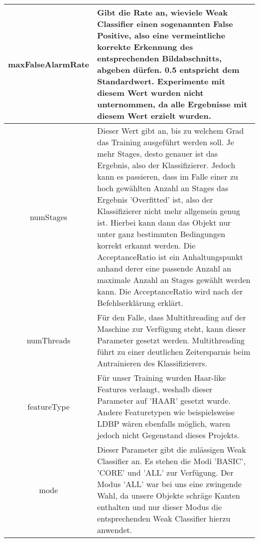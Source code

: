 \begin{table}[H]
\begin{tabularx}{\textwidth}{|c|X|}
\hline
maxFalseAlarmRate & Gibt die Rate an, wieviele Weak Classifier einen sogenannten False Positive, also eine vermeintliche korrekte Erkennung des entsprechenden Bildabschnitts, abgeben dürfen. 0.5 entspricht dem Standardwert. Experimente mit diesem Wert wurden nicht unternommen, da alle Ergebnisse mit diesem Wert erzielt wurden.\\ 
\hline
numStages & Dieser Wert gibt an, bis zu welchem Grad das Training ausgeführt werden soll. Je mehr Stages, desto genauer ist das Ergebnis, also der Klassifizierer. Jedoch kann es passieren, dass im Falle einer zu hoch gewählten Anzahl an Stages das Ergebnis 'Overfitted' ist, also der Klassifizierer nicht mehr allgemein genug ist. Hierbei kann dann das Objekt nur unter ganz bestimmten Bedingungen korrekt erkannt werden. Die AcceptanceRatio ist ein Anhaltungspunkt anhand derer eine passende Anzahl an maximale Anzahl an Stages gewählt werden kann. Die AcceptanceRatio wird nach der Befehlserklärung erklärt.\\ 
\hline
numThreads & Für den Falle, dass Multithreading auf der Maschine zur Verfügung steht, kann dieser Parameter gesetzt werden. Multithreading führt zu einer deutlichen Zeitersparnis beim Antrainieren des Klassifizierers.\\ 
\hline
featureType & Für unser Training wurden Haar-like Features verlangt, weshalb dieser Parameter auf 'HAAR' gesetzt wurde. Andere Featuretypen wie beispielsweise LDBP wären ebenfalls möglich, waren jedoch nicht Gegenstand dieses Projekts.\\ 
\hline
mode & Dieser Parameter gibt die zulässigen Weak Classifier an. Es stehen die Modi 'BASIC', 'CORE' und 'ALL' zur Verfügung. Der Modus 'ALL' war bei uns eine zwingende Wahl, da unsere Objekte schräge Kanten enthalten und nur dieser Modus die entsprechenden Weak Classifier hierzu anwendet.\\ 
\hline
\end{tabularx}
\end{table}

